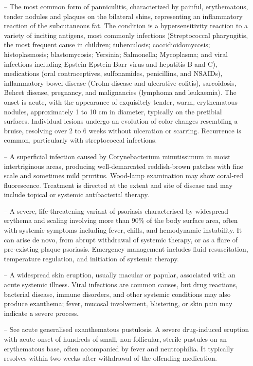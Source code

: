 -- The most common form of panniculitis, characterized by painful, erythematous, tender nodules and plaques on the bilateral shins, representing an inflammatory reaction of the subcutaneous fat. The condition is a hypersensitivity reaction to a variety of inciting antigens, most commonly infections (Streptococcal pharyngitis, the most frequent cause in children; tuberculosis; coccidioidomycosis; histoplasmosis; blastomycosis; Yersinia; Salmonella; Mycoplasma; and viral infections including Epstein-Epstein-Barr virus and hepatitis B and C), medications (oral contraceptives, sulfonamides, penicillins, and NSAIDs), inflammatory bowel disease (Crohn disease and ulcerative colitis), sarcoidosis, Behcet disease, pregnancy, and malignancies (lymphoma and leukaemia). The onset is acute, with the appearance of exquisitely tender, warm, erythematous nodules, approximately 1 to 10 cm in diameter, typically on the pretibial surfaces. Individual lesions undergo an evolution of color changes resembling a bruise, resolving over 2 to 6 weeks without ulceration or scarring. Recurrence is common, particularly with streptococcal infections.

-- A superficial infection caused by Corynebacterium minutissimum in moist intertriginous areas, producing well-demarcated reddish-brown patches with fine scale and sometimes mild pruritus. Wood-lamp examination may show coral-red fluorescence. Treatment is directed at the extent and site of disease and may include topical or systemic antibacterial therapy.

-- A severe, life-threatening variant of psoriasis characterised by widespread erythema and scaling involving more than 90\% of the body surface area, often with systemic symptoms including fever, chills, and hemodynamic instability. It can arise de novo, from abrupt withdrawal of systemic therapy, or as a flare of pre-existing plaque psoriasis. Emergency management includes fluid resuscitation, temperature regulation, and initiation of systemic therapy.

-- A widespread skin eruption, usually macular or papular, associated with an acute systemic illness. Viral infections are common causes, but drug reactions, bacterial disease, immune disorders, and other systemic conditions may also produce exanthema; fever, mucosal involvement, blistering, or skin pain may indicate a severe process.

-- See acute generalised exanthematous pustulosis. A severe drug-induced eruption with acute onset of hundreds of small, non-follicular, sterile pustules on an erythematous base, often accompanied by fever and neutrophilia. It typically resolves within two weeks after withdrawal of the offending medication.

